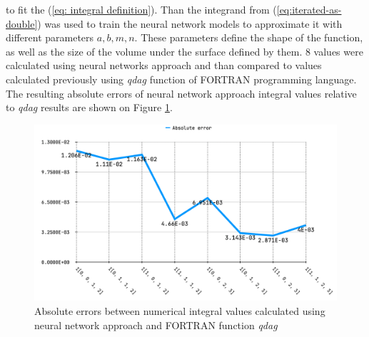 \documentclass[%
]{ittmm}
\begin{document}
\noindent to fit the (\ref{eq: integral definition}). Than the integrand from (\ref{eq:iterated-as-double}) was used to train the neural network models to approximate it with different parameters $a, b, m, n$. These parameters define the shape of the function, as well as the size of the volume under the surface defined by them. 8 values were calculated using neural networks approach and than compared to values calculated previously using \textit{qdag} function of FORTRAN programming language. The resulting absolute errors of neural network approach integral values relative to \textit{qdag} results are shown on Figure \ref{fig:ph-tests}. 

\begin{figure}
\centering
\includegraphics[width=0.85\linewidth]{iaes.png}
\caption{ Absolute errors between numerical integral values calculated using neural network approach and FORTRAN function \textit{qdag} }
\label{fig:ph-tests}
\end{figure}

\end{document}
